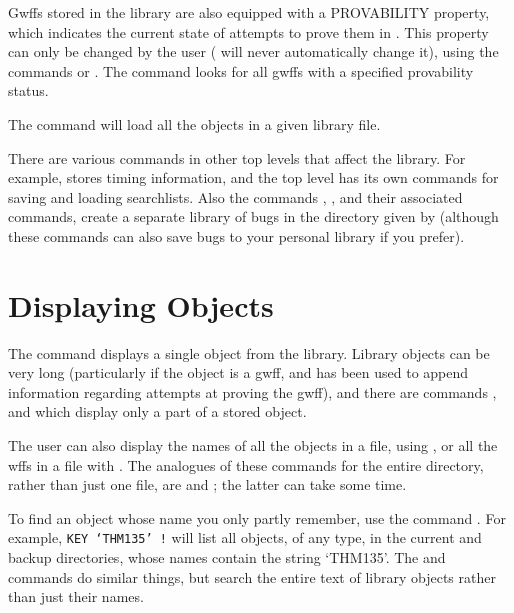 Gwffs stored in the library are also equipped with a PROVABILITY property, which
indicates the current state of attempts to prove them in {\TPS}. This property can only be changed by the user
({\TPS} will never automatically change it), using the commands  or
. The command  looks for all gwffs
with a specified provability status.

The command  will load all the objects in a given library file.

There are various commands in other top levels that affect the library. For example,
 stores timing information, and the  top level
has its own commands for saving and loading searchlists. Also the commands ,
, and their associated commands, create a separate library of
bugs in the directory given by  (although these commands can also
save bugs to your personal library if you prefer).

\section{Displaying Objects}
The  command displays a single object from the library.
Library objects can be very long (particularly if the object is a gwff, and
 has
been used to append information regarding attempts at proving the gwff), and
there are commands ,  and
 which display only a part of a stored object.

The user can also display the names of all the objects in a file, using
, or all the wffs in a file with
.
The analogues of these commands for the entire directory, rather than just one
file, are 
and ; the latter can take some time.

To find an object whose name you only partly remember, use the command .
For example, {\tt KEY `THM135' !} will list all objects, of any type, in the current and
backup directories, whose names contain
the string `THM135'. The  and  commands do similar
things, but search the entire text of library objects rather than just their names.

